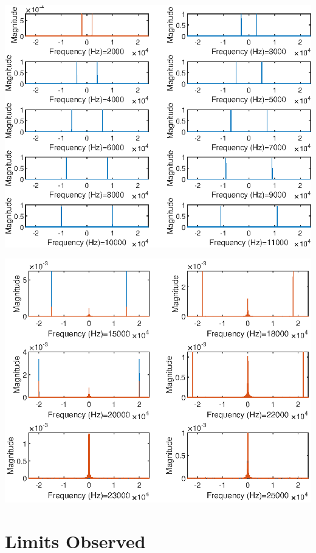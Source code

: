 \documentclass{report}
\begin{document}
\includegraphics[width=1\linewidth]{next_10.eps}

\includegraphics[width=1\linewidth]{last_six.eps}


\newpage

\section{Limits Observed}
\end{document}
